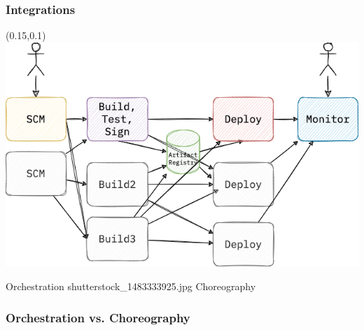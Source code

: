 \documentclass[aspectratio=169,11pt,hyperref={colorlinks=true}]{beamer}
\begin{document}
\begin{grayframe}
  \frametitle{Integrations}
  \begin{textblock*}{0.70\paperwidth}(0.15\paperwidth,0.1\paperheight)
    \includegraphics[width=0.70\paperwidth]{img/cdevents-2-no-events-multiple.png}
  \end{textblock*}
\end{grayframe}

\begin{whitetextontwopics}{%
  Orchestration
  }{shutterstock_1483333925.jpg}{%
  Choreography
  }%
  \frametitle{Orchestration vs. Choreography}
\end{whitetextontwopics}

\begin{sectionwithpicmediumcentral}{}
\end{sectionwithpicmediumcentral}
\end{document}

